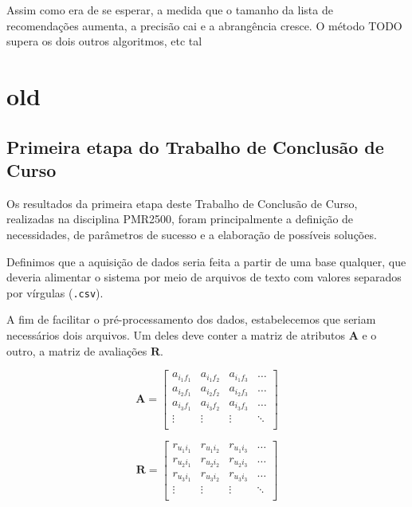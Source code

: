 Assim como era de se esperar, a medida que o tamanho da lista de recomendações aumenta, a precisão cai e a abrangência cresce. O método TODO supera os dois outros algoritmos, etc tal

\chapter[old]{old}
\label{chap:old}

\section{Primeira etapa do Trabalho de Conclusão de Curso} %
\label{sec:primeira_etapa_do_trabalho_de_conclus_o_de_curso}

Os resultados da primeira etapa deste Trabalho de Conclusão de Curso, realizadas na disciplina PMR2500, foram principalmente a definição de necessidades, de parâmetros de sucesso e a elaboração de possíveis soluções. 

Definimos que a aquisição de dados seria feita a partir de uma base qualquer, que deveria alimentar o sistema por meio de arquivos de texto com valores separados por vírgulas (\texttt{.csv}).

A fim de facilitar o pré-processamento dos dados, estabelecemos que seriam necessários dois arquivos. Um deles deve conter a matriz de atributos $\mathbf{A}$ e o outro, a matriz de avaliações  $\mathbf{R}$. 

\begin{equation} 
\mathbf{A} = 
\begin{bmatrix} 
 a_{i_1 f_1} &  a_{i_1 f_2} &  a_{i_1 f_3}  & \dots   \\
 a_{i_2 f_1} &  a_{i_2 f_2} &  a_{i_2 f_3}  & \dots   \\
 a_{i_3 f_1} &  a_{i_3 f_2} &  a_{i_3 f_3}  & \dots  \\ 
 \vdots &  \vdots &  \vdots  & \ddots   \\
 \end{bmatrix}
\end{equation}


\begin{equation}
	  \mathbf{R} = 
\begin{bmatrix} 
  r_{u_1 i_1} &  r_{u_1 i_2} &  r_{u_1 i_3}  & \dots   \\
 r_{u_2 i_1} &  r_{u_2 i_2} &  r_{u_2 i_3}  & \dots   \\
 r_{u_3 i_1} &  r_{u_3 i_2} &  r_{u_3 i_3}  & \dots  \\ 
 \vdots &  \vdots &  \vdots  & \ddots   \\
\end{bmatrix}
\end{equation}

